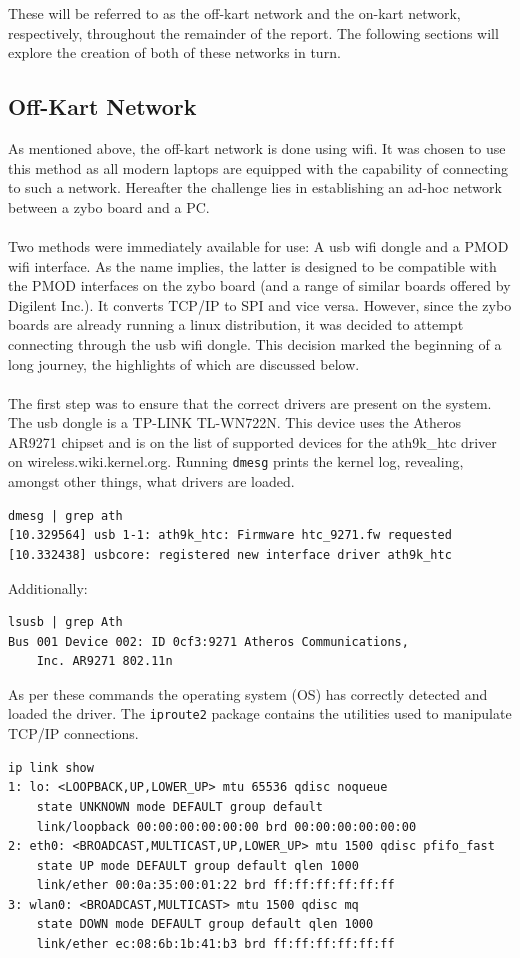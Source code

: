 These will be referred to as the off-kart network and the on-kart network, respectively, throughout the remainder of the report.
The following sections will explore the creation of both of these networks in turn.

\subsection{Off-Kart Network}
As mentioned above, the off-kart network is done using wifi.
It was chosen to use this method as all modern laptops are equipped with the capability of connecting to such a network.
Hereafter the challenge lies in establishing an ad-hoc network between a zybo board and a PC.
\\~\\
Two methods were immediately available for use: A usb wifi dongle and a PMOD wifi interface.
As the name implies, the latter is designed to be compatible with the PMOD interfaces on the zybo board (and a range of similar boards offered by Digilent Inc.).
It converts TCP/IP to SPI and vice versa.
However, since the zybo boards are already running a linux distribution, it was decided to attempt connecting through the usb wifi dongle.
This decision marked the beginning of a long journey, the highlights of which are discussed below. 
\\~\\
The first step was to ensure that the correct drivers are present on the system.
The usb dongle is a TP-LINK TL-WN722N.
This device uses the Atheros AR9271 chipset and is on the list of supported devices for the ath9k\_htc driver on wireless.wiki.kernel.org.
Running \texttt{dmesg} prints the kernel log, revealing, amongst other things, what drivers are loaded.
\begin{lstlisting}
dmesg | grep ath
[10.329564] usb 1-1: ath9k_htc: Firmware htc_9271.fw requested
[10.332438] usbcore: registered new interface driver ath9k_htc
\end{lstlisting}
Additionally:
\begin{lstlisting}
lsusb | grep Ath
Bus 001 Device 002: ID 0cf3:9271 Atheros Communications, 
	Inc. AR9271 802.11n
\end{lstlisting}
As per these commands the operating system (OS) has correctly detected and loaded the driver.
The \texttt{iproute2} package contains the utilities used to manipulate TCP/IP connections.
\begin{lstlisting}
ip link show
1: lo: <LOOPBACK,UP,LOWER_UP> mtu 65536 qdisc noqueue 
	state UNKNOWN mode DEFAULT group default 
    link/loopback 00:00:00:00:00:00 brd 00:00:00:00:00:00
2: eth0: <BROADCAST,MULTICAST,UP,LOWER_UP> mtu 1500 qdisc pfifo_fast 
	state UP mode DEFAULT group default qlen 1000
    link/ether 00:0a:35:00:01:22 brd ff:ff:ff:ff:ff:ff
3: wlan0: <BROADCAST,MULTICAST> mtu 1500 qdisc mq 
	state DOWN mode DEFAULT group default qlen 1000
    link/ether ec:08:6b:1b:41:b3 brd ff:ff:ff:ff:ff:ff
\end{lstlisting}
